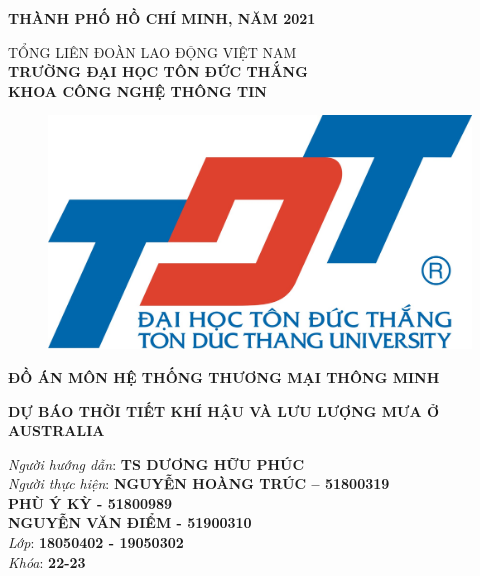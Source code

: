 \documentclass{article}
\begin{document}
\vspace{1cm}
\begin{center}
	\fontsize{14}{20}\selectfont
	\textbf{THÀNH PHỐ HỒ CHÍ MINH, NĂM 2021}
\end{center}
\pagebreak

\begin{center}
	\fontsize{14}{20}\selectfont
	\textsc{TỔNG LIÊN ĐOÀN LAO ĐỘNG VIỆT NAM\\ 
	\textbf{TRƯỜNG ĐẠI HỌC TÔN ĐỨC THẮNG\\} 
	\textbf{KHOA CÔNG NGHỆ THÔNG TIN}}
	
	\vspace{0.8cm}
	\begin{figure}[htp]
	\begin{center}
		\includegraphics[scale=0.04]{images/logo.png}
	\end{center}
	\end{figure}

	\fontsize{16}{20}\selectfont\textbf{ĐỒ ÁN MÔN HỆ THỐNG THƯƠNG MẠI THÔNG MINH\\}
	
	\vspace{2cm}
	\fontsize{24}{20}\selectfont\textbf{DỰ BÁO THỜI TIẾT KHÍ HẬU VÀ LƯU LƯỢNG MƯA Ở AUSTRALIA}
\end{center}

\vspace{1cm}
\begin{flushright}
	\fontsize{14}{20}\selectfont
	\textit{Người hướng dẫn}: \textbf{TS DƯƠNG HỮU PHÚC}\\
	\textit{Người thực hiện}: \textbf{NGUYỄN HOÀNG TRÚC – 51800319}\\
	\textbf{PHÙ Ý KỲ - 51800989}\\
	\textbf{NGUYỄN VĂN ĐIỂM - 51900310}\\
	\textit{Lớp}: \textbf{18050402 - 19050302}\\
	\textit{Khóa}: \textbf{22-23}\\
\end{flushright}
\end{document}
